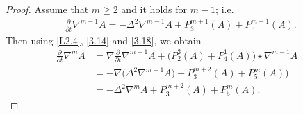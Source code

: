 \documentclass{amsart}
\theoremstyle{definition}
\numberwithin{equation}{section}
\begin{document}
\begin{proof}
Assume that $m\geq 2$ and it holds for $m-1$; i.e.
\begin{align}\label{3.18}
 \frac{\partial}{\partial t} \nabla^{m-1} A=-\Delta^2 \nabla^{m-1} A+P_3^{m+1}(A)+P_5^{m-1}(A).
\end{align}
Then using \eqref{L2.4},  \eqref{3.14} and \eqref{3.18}, we obtain
\begin{align}\label{Lm}
\frac{\partial}{\partial t} \nabla^{m} A&=\nabla\frac{\partial}{\partial t}  \nabla^{m-1} A+ \big(P_2^3(A)+P_4^1(A)\big)\star \nabla^{m-1}A&\\
& =-\nabla  \big (\Delta^2 \nabla^{m-1} A\big)+P_3^{m+2}(A)+P_5^{m}(A)) \nonumber\\
&=-\Delta^2 \nabla^{m} A+P_3^{m+2}(A)+P_5^{m}(A)\nonumber.
\end{align}


\end{proof}
\end{document}
